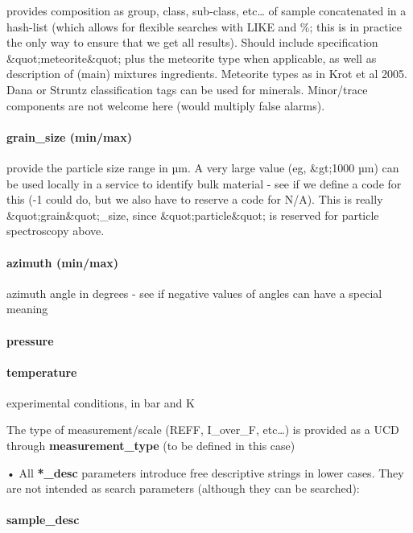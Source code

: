 \documentclass[11pt,a4paper]{ivoa}
\begin{document}
provides composition as group, class, sub-class, etc… of sample concatenated in a hash-list (which allows for flexible searches with LIKE and \%; this is in practice the only way to ensure that we get all results). Should include specification \&quot;meteorite\&quot; plus the meteorite type when applicable, as well as description of (main) mixtures ingredients. Meteorite types as in Krot et al 2005. Dana or Struntz classification tags can be used for minerals. Minor/trace components are not welcome here (would multiply false alarms).

\paragraph{\textbf{grain\_size (min/max)}}

provide the particle size range in µm. A very large value (eg, \&gt;1000 µm) can be used locally in a service to identify bulk material - see if we define a code for this (-1 could do, but we also have to reserve a code for N/A). This is really \&quot;grain\&quot;\_size, since \&quot;particle\&quot; is reserved for particle spectroscopy above.\\

\paragraph{\textbf{azimuth} (min/max)}

azimuth angle in degrees - see if negative values of angles can have a special meaning

\paragraph{pressure}

\paragraph{\textbf{temperature}}

experimental conditions, in bar and K

The type of measurement/scale (REFF, I\_over\_F, etc…) is provided as a UCD through \textbf{measurement\_type} (to be defined in this case)

• All \textbf{*\_desc} parameters introduce free descriptive strings in lower cases. They are not intended as search parameters (although they can be searched):

\paragraph{sample\_desc}
\end{document}
